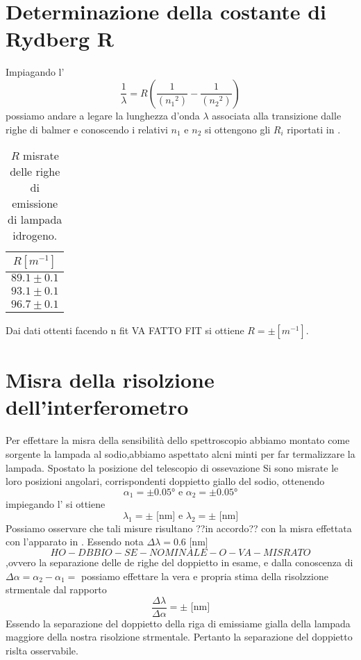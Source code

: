 \section{Determinazione della costante di Rydberg R}
	Impiagando l'
	\smallskip
	\begin{equation}\label{eq:ryd}
	\frac{1}{\lambda}=R(\frac{1}{({n_1}^2)}-\frac{1}{({n_2}^2)})
	\end{equation}
	\smallskip
	possiamo andare a legare la lunghezza d'onda $\lambda$
	associata alla transizione dalle righe di balmer e conoscendo 
	i relativi $n_1$ e $n_2$
	si ottengono gli $R_i$ riportati in .
		\smallskip
	\begin{table}[hb]
	\centering
		\begin{tabular}{|c|}
		\hline
		$ R [m^{-1}]$ \\
		\hline
		$89.1 \pm 0.1$\\
		\hline
		$93.1 \pm 0.1$\\
		\hline
		$96.7 \pm 0.1$\\
		\hline
		\end{tabular}
		\caption{$R$ misrate delle righe di emissione di lampada idrogeno.}
		\label{tab:R}
	\end{table}
	\smallskip
	Dai dati ottenti facendo n fit \bigskip
	VA FATTO FIT
	\bigskip si ottiene
	$R= 	\pm		[m^{-1}]$.
\section{Misra della risolzione dell'interferometro}
	Per effettare la misra della sensibilità dello
	spettroscopio abbiamo montato come sorgente la 
	lampada al sodio,abbiamo aspettato alcni minti
	per far termalizzare  la lampada.
	Spostato la posizione del telescopio
	di ossevazione Si sono misrate le loro posizioni angolari,
	corrispondenti  doppietto giallo
	del sodio, ottenendo $$\alpha_1=		\pm \ang{0.05}
	\text{ e }\alpha_2=		\pm \ang{0.05}$$
	impiegando l' si ottiene 
	\smallskip
	$$\lambda_1= 		\pm		\text{ [nm] e } \lambda_2= 		\pm		\text{ [nm]}$$
	Possiamo osservare che tali misure risultano ??in accordo?? con 
	la misra effettata con l'apparato in .
	Essendo nota $\Delta 	\lambda=0.6 \text{ [nm]}$
	$$HO-DBBIO-SE-NOMINALE-O-VA-MISRATO$$
	,ovvero la separazione delle de
	righe del doppietto in esame, e dalla conoscenza di 
	$\Delta \alpha= \alpha_2 -\alpha_1 =$
	possiamo effettare la vera e propria stima della
	risolzzione strmentale dal rapporto 
	$$ \frac{\Delta \lambda}{\Delta \alpha}= 	\pm			\text{ [nm]}$$
	Essendo la separazione del doppietto della riga di emissiame gialla
	della lampada maggiore della nostra risolzione strmentale.
	Pertanto la separazione del doppietto rislta osservabile.